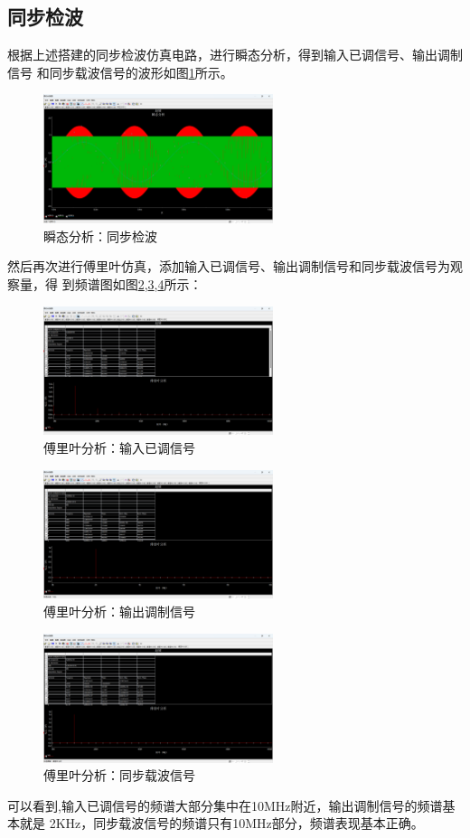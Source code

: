 \documentclass[UTF8]{ctexart}
\begin{document}
\subsection{同步检波}
根据上述搭建的同步检波仿真电路，进行瞬态分析，得到输入已调信号、输出调制信号
和同步载波信号的波形如图\ref{img:20}所示。
\begin{figure}[htbp]
    \centering
    \includegraphics[width=0.6\textwidth]{20.png}
    \caption{瞬态分析：同步检波}
    \label{img:20}
\end{figure}
然后再次进行傅里叶仿真，添加输入已调信号、输出调制信号和同步载波信号为观察量，得
到频谱图如图\ref{img:21},\ref{img:22},\ref{img:23}所示：
\begin{figure}[htbp]
    \centering
    \includegraphics[width=0.6\textwidth]{21.png}
    \caption{傅里叶分析：输入已调信号}
    \label{img:21}
\end{figure}
\begin{figure}[htbp]
    \centering
    \includegraphics[width=0.6\textwidth]{22.png}
    \caption{傅里叶分析：输出调制信号}
    \label{img:22}
\end{figure}
\begin{figure}[htbp]
    \centering
    \includegraphics[width=0.6\textwidth]{23.png}
    \caption{傅里叶分析：同步载波信号}
    \label{img:23}
\end{figure}
可以看到,输入已调信号的频谱大部分集中在10MHz附近，输出调制信号的频谱基本就是
2KHz，同步载波信号的频谱只有10MHz部分，频谱表现基本正确。
\end{document}
